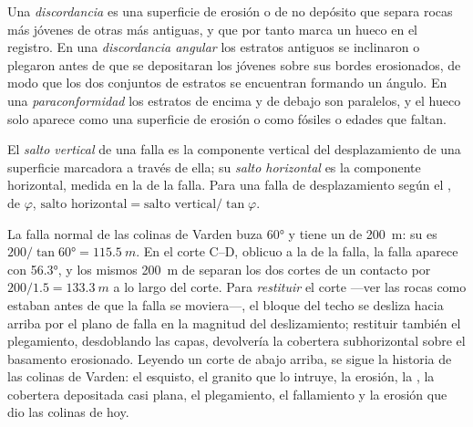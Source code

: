 \begin{definition}\label{def:b1:cross-sections:unconformity}
Una \emph{discordancia} es una superficie de erosión o de no depósito que separa
rocas más jóvenes de otras más antiguas, y que por tanto marca un hueco en el registro. En una
\emph{discordancia angular} los estratos antiguos se inclinaron o
plegaron antes de que se depositaran los jóvenes sobre sus bordes erosionados, de modo que los dos
conjuntos de estratos se encuentran formando un ángulo. En una \emph{paraconformidad}
los estratos de encima y de debajo son paralelos, y el hueco solo aparece como una superficie de
erosión o como fósiles o edades que faltan.
\end{definition}

\begin{definition}\label{def:b1:cross-sections:throw}
El \emph{salto vertical} de una falla es la componente vertical del
desplazamiento de una superficie marcadora a través de ella; su \emph{salto horizontal} es la componente horizontal, medida en la  de la falla. Para una
falla de desplazamiento según el , de  $\varphi$, $\text{salto horizontal} = \text{salto vertical}/\tan\varphi$.
\end{definition}

La falla normal de las colinas de Varden buza \ang{60} y tiene un  de \qty{200}{m}: su
 es $200/\tan\ang{60} = \qty{115.5}{m}$. En el corte C--D, oblicuo a la  de la falla, la falla aparece con \ang{56.3}, y los mismos \qty{200}{m} de 
separan los dos cortes de un contacto por $200/1.5 = \qty{133.3}{m}$ a lo largo del corte. Para
\emph{restituir} el corte ---ver las rocas como estaban antes de que la falla se moviera---, el bloque
del techo se desliza hacia arriba por el plano de falla en la magnitud del deslizamiento; restituir
también el plegamiento, desdoblando las capas, devolvería la cobertera subhorizontal sobre el
basamento erosionado. Leyendo un corte de abajo arriba, se sigue la historia de las colinas de
Varden: el esquisto, el granito que lo intruye, la erosión, la , la cobertera
depositada casi plana, el plegamiento, el fallamiento y la erosión que dio las colinas de hoy.

